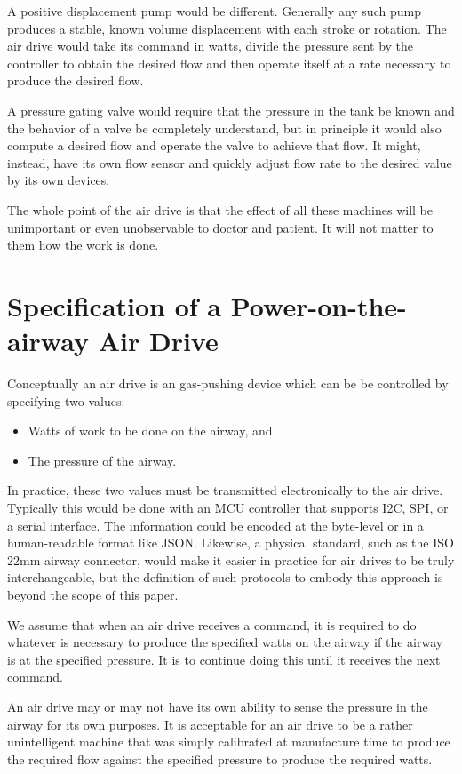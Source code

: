 \documentclass[conference]{article}
\begin{document}
A positive displacement pump would be different. Generally any such pump produces a stable, known volume displacement with each
stroke or rotation. The air drive would take its command in watts, divide the pressure sent by the controller to obtain
the desired flow and then operate itself at a rate necessary to produce the desired flow.

A pressure gating valve would require that the pressure in the tank be known and the behavior of a valve
be completely understand, but in principle it would also compute a desired flow and operate the valve to achieve that
flow. It might, instead, have its own flow sensor and quickly adjust flow rate to the desired value by its own devices.

The whole point of the air drive is that the effect of all these machines will be unimportant or even unobservable
to doctor and patient. It will not matter to them how the work is done.

\section{Specification of a Power-on-the-airway Air Drive}

Conceptually an air drive is an gas-pushing device which can be be controlled by specifying two values:
\begin{itemize}
 \item Watts of work to be done on the airway, and
 \item The pressure of the airway.
\end{itemize}

In practice, these two values must be transmitted electronically to the air drive.
Typically this would be done with an MCU controller that supports I2C, SPI,
or a serial interface.
The information could be encoded at the byte-level or
in a human-readable format like JSON.
Likewise, a physical standard, such as the ISO 22mm airway connector,
would make it easier
in practice for air drives to be truly interchangeable, but
the definition of such protocols to embody this approach
is beyond the scope of this paper.

We assume that when an air drive receives a command, it is required to
do whatever is necessary to produce the specified
watts on the airway if the airway is at the specified pressure.
It is to continue doing this until it receives the next command.

An air drive may or may not have its own ability to sense the pressure in the airway
for its own purposes. It is acceptable for an air drive to be a rather unintelligent
machine that was simply calibrated at manufacture time to produce the required
flow against the specified pressure to produce the required watts.
\end{document}
